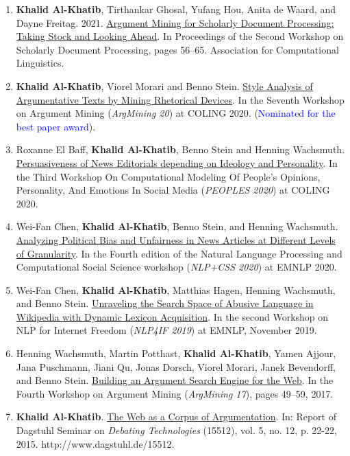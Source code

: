 \begin{enumerate}
\item{\textbf{Khalid Al-Khatib}, Tirthankar Ghosal, Yufang Hou, Anita de Waard, and Dayne Freitag. 2021. \href{https://aclanthology.org/2021.sdp-1.7/}{Argument Mining for Scholarly Document Processing: Taking Stock and Looking Ahead}. In Proceedings of the Second Workshop on Scholarly Document Processing, pages 56--65. Association for Computational Linguistics.
}
\item{\textbf{Khalid Al-Khatib}, Viorel Morari and Benno Stein. \href{https://aclanthology.org/2020.argmining-1.12/}{Style Analysis of Argumentative Texts by Mining Rhetorical Devices}.  In the Seventh Workshop on Argument Mining (\textit{ArgMining 20}) at COLING 2020. (\textcolor{blue}{Nominated for the best paper award}).}
\item{Roxanne El Baff, \textbf{Khalid Al-Khatib}, Benno Stein and Henning Wachsmuth. \href{https://aclanthology.org/2020.peoples-1.4/}{Persuasiveness of News Editorials depending on Ideology and Personality}. In the 
Third Workshop On Computational Modeling Of People’s Opinions, Personality, And Emotions In Social Media (\textit{PEOPLES 2020}) at COLING 2020.}
\item{Wei-Fan Chen, \textbf{Khalid Al-Khatib}, Benno Stein, and Henning Wachsmuth. \href{https://aclanthology.org/2020.nlpcss-1.16/}{Analyzing Political Bias and Unfairness in News Articles at Different Levels of Granularity}. In the Fourth edition of the Natural Language Processing and Computational Social Science workshop (\textit{NLP+CSS 2020}) at EMNLP 2020.}
\item{Wei-Fan Chen, \textbf{Khalid Al-Khatib}, Matthias Hagen, Henning Wachsmuth, and Benno Stein. \href{https://aclanthology.org/D19-5009/}{Unraveling the Search Space of Abusive Language in Wikipedia with Dynamic Lexicon Acquisition}. In the second Workshop on NLP for Internet Freedom (\textit{NLP4IF 2019}) at EMNLP, November 2019.}
\item {Henning Wachsmuth, Martin Potthast, \textbf{Khalid Al-Khatib}, Yamen Ajjour, Jana Puschmann, Jiani Qu, Jonas Dorsch, Viorel Morari, Janek Bevendorff, and Benno Stein. \href{https://aclanthology.org/W17-5106/}{Building an Argument Search Engine for the Web}. In the Fourth Workshop on Argument Mining (\textit{ArgMining 17}), pages 49–59, 2017.}
\item {\textbf{Khalid Al-Khatib}. \href{https://drops.dagstuhl.de/storage/04dagstuhl-reports/volume05/issue12/15512/DagRep.5.12.18/DagRep.5.12.18.pdf#page=5}{The Web as a Corpus of Argumentation}. In: Report of Dagstuhl Seminar on \textit{Debating Technologies} (15512), vol. 5, no. 12, p. 22-22, 2015. http://www.dagstuhl.de/15512.}

\end{enumerate}
